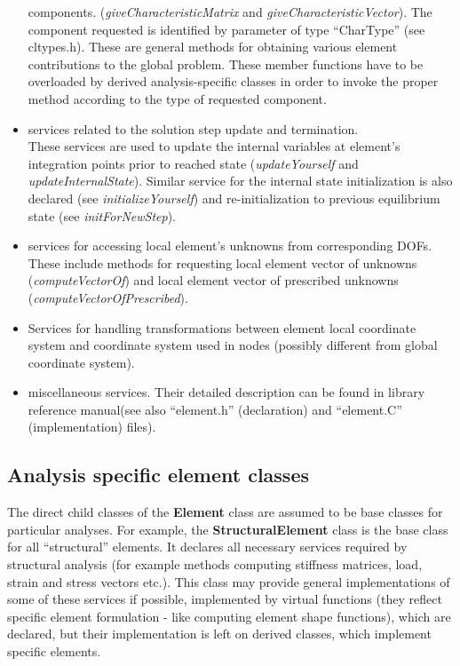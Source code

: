\documentclass[12pt,draft]{article}
\newcommand{\class}[1]{{\bf #1}}
\newcommand{\service}[1]{{\em #1}}
\newcommand{\file}[1]{``#1''}
\newcommand{\refman}{\oofem library reference manual}
\begin{document}
\begin{itemize}
components. (\service{giveCharacteristicMatrix} and
\service{giveCharacteristicVector}). 
The component requested is identified by parameter of type
``CharType'' (see cltypes.h). These are general methods for obtaining various element
contributions to the global problem. These member functions have to
be overloaded by derived analysis-specific 
classes in order to invoke the proper method according to the type of
requested component.
\item
services related to the solution step update and termination.\\
These services are used to update the internal variables at
element's integration points prior to reached state
(\service{updateYourself} and \service{updateInternalState}).
Similar service for the internal state initialization is also declared
(see \service{initializeYourself}) and re-initialization to previous
equilibrium state (see \service{initForNewStep}).
\item
services for accessing local element's unknowns from corresponding DOFs.
These include methods for requesting local element vector of unknowns
(\service{computeVectorOf}) and local element vector of prescribed
unknowns (\service{computeVectorOfPrescribed}).
\item
Services for handling transformations between element local coordinate
system and coordinate system used in nodes (possibly different from
global coordinate system).  
\item
miscellaneous services. Their detailed description can be found in
\refman (see also \file{element.h} (declaration) and
\file{element.C} (implementation) files).

\end{itemize}

\subsection{Analysis specific element classes}
The direct child classes of the \class{Element} class are assumed to be base
classes for particular analyses. For example, the
\class{StructuralElement} class is the base class for all ``structural''
elements. It declares all necessary services required by structural
analysis (for example methods computing stiffness  matrices, load,
strain and stress  vectors etc.). This class may provide general
implementations of some of these services if possible, implemented
by virtual functions (they reflect specific element formulation
- like computing element shape functions), which are declared, but
their implementation is left on derived classes, which implement specific
elements.
\end{document}
